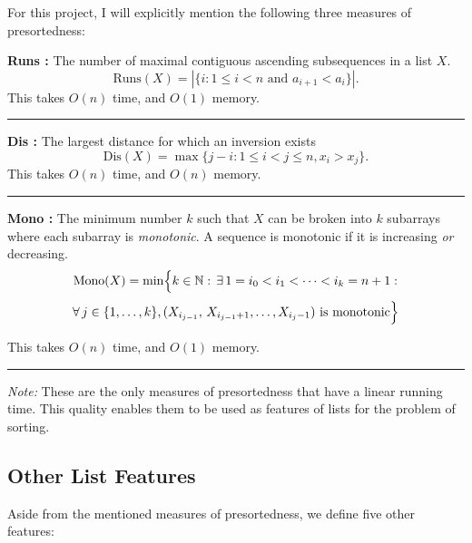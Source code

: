 \documentclass[twocolumn]{article}
\renewcommand{\leq}{\leqslant}
\newcommand{\vsp}{\vspace{0.5em}}
\newcommand{\ruler}{
    \vspace{1em}
    \hrule
    \vspace{1em}
}
\begin{document}
For this project, I will explicitly mention the following three measures of presortedness:

\vsp


\noindent \textbf{Runs \cite{knuth1973}:}
The number of maximal contiguous ascending subsequences in a list $X$. 
\[
\text{Runs}(X) = \left|\{i : 1 \leq i < n \text{ and } a_{i+1} < a_i\}\right|.
\]
This takes $O(n)$ time, and $O(1)$ memory.

\ruler

\vsp

\noindent \textbf{Dis \cite{adaptivesortingsurvey}:}
The largest distance for which an inversion exists
\[
\text{Dis}(X) = \operatorname{max}\{j - i : 1 \leq i < j \leq n, x_i > x_j\}.
\]
This takes $O(n)$ time, and $O(n)$ memory.

\ruler

\vsp

\noindent \textbf{Mono \cite{sortingrace2016}:} 
The minimum number $k$ such that $X$ can be broken into $k$ subarrays where each subarray is \emph{monotonic}. A sequence is monotonic if it is increasing \emph{or} decreasing.
\[
\operatorname{Mono}(X)
=
\min\Bigl\{
k \in \mathbb{N}
:\,\exists\,1 = i_{0} < i_{1} < \cdots < i_{k} = n+1 :
\Bigr.
\]
\[
\Bigl.
\forall\, j \in \{1,\dots,k\},
(X_{i_{j-1}},\,X_{i_{j-1}+1},\dots,X_{i_{j}-1})
\text{ is monotonic}
\Bigr\}
\]

This takes $O(n)$ time, and $O(1)$ memory.
\ruler

\vsp

\noindent \textit{Note: }These are the only measures of presortedness that have a linear running time. This quality enables them to be used as features of lists for the problem of sorting.

\subsection{Other List Features}
Aside from the mentioned measures of presortedness, we define five other features:
\end{document}
